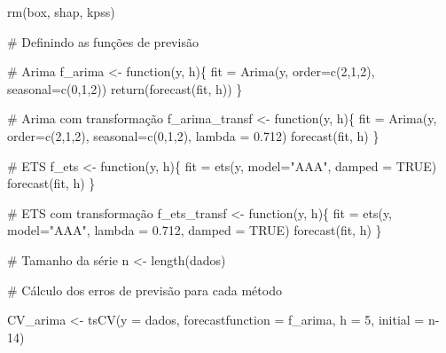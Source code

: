\documentclass[
  letterpaper,
  DIV=11,
  numbers=noendperiod]{scrartcl}
\newenvironment{Shaded}{\begin{snugshade}}{\end{snugshade}}
\newcommand{\AttributeTok}[1]{\textcolor[rgb]{0.40,0.45,0.13}{#1}}
\newcommand{\CommentTok}[1]{\textcolor[rgb]{0.37,0.37,0.37}{#1}}
\newcommand{\ConstantTok}[1]{\textcolor[rgb]{0.56,0.35,0.01}{#1}}
\newcommand{\ControlFlowTok}[1]{\textcolor[rgb]{0.00,0.23,0.31}{#1}}
\newcommand{\DecValTok}[1]{\textcolor[rgb]{0.68,0.00,0.00}{#1}}
\newcommand{\FloatTok}[1]{\textcolor[rgb]{0.68,0.00,0.00}{#1}}
\newcommand{\FunctionTok}[1]{\textcolor[rgb]{0.28,0.35,0.67}{#1}}
\newcommand{\NormalTok}[1]{\textcolor[rgb]{0.00,0.23,0.31}{#1}}
\newcommand{\OtherTok}[1]{\textcolor[rgb]{0.00,0.23,0.31}{#1}}
\newcommand{\StringTok}[1]{\textcolor[rgb]{0.13,0.47,0.30}{#1}}
\begin{document}
\begin{Shaded}
\begin{Highlighting}[]
\FunctionTok{rm}\NormalTok{(box, shap, kpss)}


\CommentTok{\# Definindo as funções de previsão}

\CommentTok{\# Arima}
\NormalTok{f\_arima }\OtherTok{\textless{}{-}} \ControlFlowTok{function}\NormalTok{(y, h)\{}
\NormalTok{fit }\OtherTok{=} \FunctionTok{Arima}\NormalTok{(y, }\AttributeTok{order=}\FunctionTok{c}\NormalTok{(}\DecValTok{2}\NormalTok{,}\DecValTok{1}\NormalTok{,}\DecValTok{2}\NormalTok{), }\AttributeTok{seasonal=}\FunctionTok{c}\NormalTok{(}\DecValTok{0}\NormalTok{,}\DecValTok{1}\NormalTok{,}\DecValTok{2}\NormalTok{))}
\FunctionTok{return}\NormalTok{(}\FunctionTok{forecast}\NormalTok{(fit, h))}
\NormalTok{\}}

\CommentTok{\# Arima com transformação}
\NormalTok{f\_arima\_transf }\OtherTok{\textless{}{-}} \ControlFlowTok{function}\NormalTok{(y, h)\{}
\NormalTok{fit }\OtherTok{=} \FunctionTok{Arima}\NormalTok{(y, }\AttributeTok{order=}\FunctionTok{c}\NormalTok{(}\DecValTok{2}\NormalTok{,}\DecValTok{1}\NormalTok{,}\DecValTok{2}\NormalTok{), }\AttributeTok{seasonal=}\FunctionTok{c}\NormalTok{(}\DecValTok{0}\NormalTok{,}\DecValTok{1}\NormalTok{,}\DecValTok{2}\NormalTok{), }\AttributeTok{lambda =} \FloatTok{0.712}\NormalTok{)}
\FunctionTok{forecast}\NormalTok{(fit, h)}
\NormalTok{\}}

\CommentTok{\# ETS}
\NormalTok{f\_ets }\OtherTok{\textless{}{-}} \ControlFlowTok{function}\NormalTok{(y, h)\{}
\NormalTok{fit }\OtherTok{=} \FunctionTok{ets}\NormalTok{(y, }\AttributeTok{model=}\StringTok{"AAA"}\NormalTok{, }\AttributeTok{damped =} \ConstantTok{TRUE}\NormalTok{)}
\FunctionTok{forecast}\NormalTok{(fit, h)}
\NormalTok{\}}

\CommentTok{\# ETS com transformação}
\NormalTok{f\_ets\_transf }\OtherTok{\textless{}{-}} \ControlFlowTok{function}\NormalTok{(y, h)\{}
\NormalTok{fit }\OtherTok{=} \FunctionTok{ets}\NormalTok{(y, }\AttributeTok{model=}\StringTok{"AAA"}\NormalTok{, }\AttributeTok{lambda =} \FloatTok{0.712}\NormalTok{, }\AttributeTok{damped =} \ConstantTok{TRUE}\NormalTok{)}
\FunctionTok{forecast}\NormalTok{(fit, h)}
\NormalTok{\}}


\CommentTok{\# Tamanho da série}
\NormalTok{n }\OtherTok{\textless{}{-}} \FunctionTok{length}\NormalTok{(dados)}

\CommentTok{\# Cálculo dos erros de previsão para cada método}

\NormalTok{CV\_arima }\OtherTok{\textless{}{-}} \FunctionTok{tsCV}\NormalTok{(}\AttributeTok{y =}\NormalTok{ dados, }\AttributeTok{forecastfunction =}\NormalTok{ f\_arima, }\AttributeTok{h =} \DecValTok{5}\NormalTok{, }\AttributeTok{initial =}\NormalTok{ n}\DecValTok{{-}14}\NormalTok{)}


\end{Highlighting}
\end{Shaded}
\end{document}
